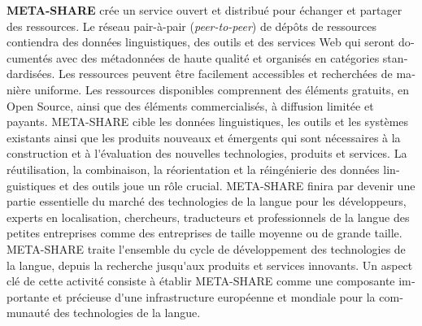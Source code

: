\documentclass[]{../metanetpaper}
\begin{document}
\begin{french}
\begin{multicols}{2}
\textbf{META-SHARE} crée un service ouvert et distribué pour échanger et partager des ressources. Le réseau pair-à-pair ({\it peer-to-peer}) de dépôts de ressources contiendra des données linguistiques, des outils et des services Web qui seront documentés avec des métadonnées de haute qualité et organisés en catégories standardisées. Les ressources peuvent être facilement accessibles et recherchées de manière uniforme. Les ressources disponibles comprennent des éléments gratuits, en Open Source, ainsi que des éléments commercialisés, à diffusion limitée et payants. META-SHARE cible les données linguistiques, les outils et les systèmes existants ainsi que les produits nouveaux et émergents qui sont nécessaires à la construction et à l{\mbox '}évaluation des nouvelles technologies, produits et services. La réutilisation, la combinaison, la réorientation et la réingénierie des données linguistiques et des outils joue un rôle crucial. META-SHARE finira par devenir une partie essentielle du marché des technologies de la langue pour les développeurs, experts en localisation, chercheurs, traducteurs et professionnels de la langue des petites entreprises comme des entreprises de taille moyenne ou de grande taille. META-SHARE traite l{\mbox '}ensemble du cycle de développement des technologies de la langue, depuis la recherche jusqu{\mbox '}aux produits et services innovants. Un aspect clé de cette activité consiste à établir META-SHARE comme une composante importante et précieuse d{\mbox '}une infrastructure européenne et mondiale pour la communauté des technologies de la langue.


\end{multicols}
\end{french}
\end{document}
